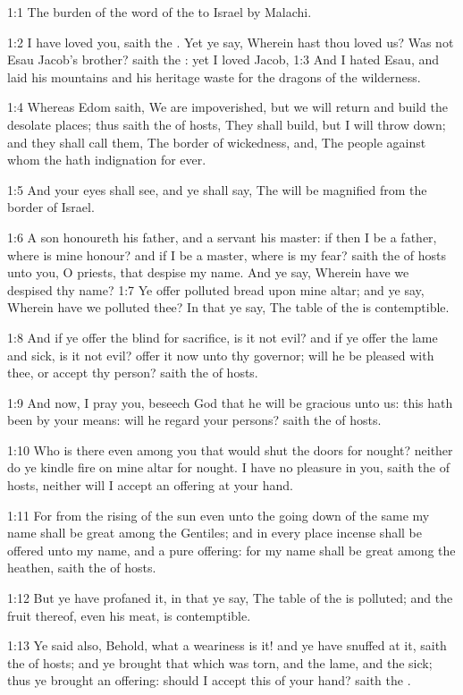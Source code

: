 

1:1 The burden of the word of the \LORD to Israel by Malachi.

1:2 I have loved you, saith the \LORD. Yet ye say, Wherein hast thou loved us? Was not Esau Jacob's brother? saith the \LORD: yet I loved Jacob, 1:3 And I hated Esau, and laid his mountains and his heritage waste for the dragons of the wilderness.

1:4 Whereas Edom saith, We are impoverished, but we will return and build the desolate places; thus saith the \LORD of hosts, They shall build, but I will throw down; and they shall call them, The border of wickedness, and, The people against whom the \LORD hath indignation for ever.

1:5 And your eyes shall see, and ye shall say, The \LORD will be magnified from the border of Israel.

1:6 A son honoureth his father, and a servant his master: if then I be a father, where is mine honour? and if I be a master, where is my fear? saith the \LORD of hosts unto you, O priests, that despise my name. And ye say, Wherein have we despised thy name?  1:7 Ye offer polluted bread upon mine altar; and ye say, Wherein have we polluted thee? In that ye say, The table of the \LORD is contemptible.

1:8 And if ye offer the blind for sacrifice, is it not evil? and if ye offer the lame and sick, is it not evil? offer it now unto thy governor; will he be pleased with thee, or accept thy person? saith the \LORD of hosts.

1:9 And now, I pray you, beseech God that he will be gracious unto us: this hath been by your means: will he regard your persons? saith the \LORD of hosts.

1:10 Who is there even among you that would shut the doors for nought?  neither do ye kindle fire on mine altar for nought. I have no pleasure in you, saith the \LORD of hosts, neither will I accept an offering at your hand.

1:11 For from the rising of the sun even unto the going down of the same my name shall be great among the Gentiles; and in every place incense shall be offered unto my name, and a pure offering: for my name shall be great among the heathen, saith the \LORD of hosts.

1:12 But ye have profaned it, in that ye say, The table of the \LORD is polluted; and the fruit thereof, even his meat, is contemptible.

1:13 Ye said also, Behold, what a weariness is it! and ye have snuffed at it, saith the \LORD of hosts; and ye brought that which was torn, and the lame, and the sick; thus ye brought an offering: should I accept this of your hand? saith the \LORD.


